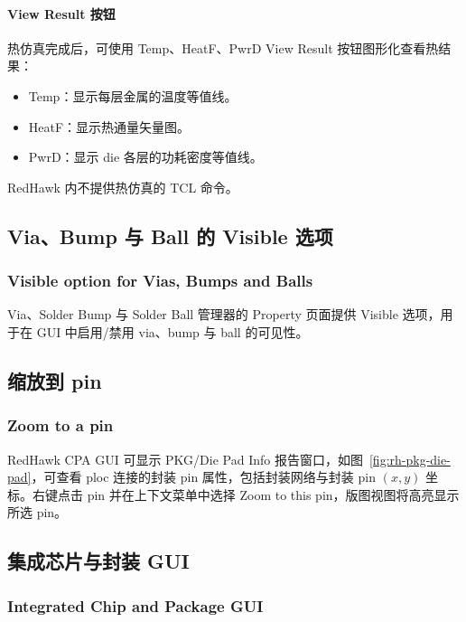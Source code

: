 \paragraph{View Result 按钮}
热仿真完成后，可使用 Temp、HeatF、PwrD View Result 按钮图形化查看热结果：
\begin{itemize}
  \item Temp：显示每层金属的温度等值线。
  \item HeatF：显示热通量矢量图。
  \item PwrD：显示 die 各层的功耗密度等值线。
\end{itemize}

RedHawk 内不提供热仿真的 TCL 命令。

\subsection{Via、Bump 与 Ball 的 Visible 选项}
\subsubsection*{Visible option for Vias, Bumps and Balls}

Via、Solder Bump 与 Solder Ball 管理器的 Property 页面提供 Visible 选项，用于在 GUI 中启用/禁用 via、bump 与 ball 的可见性。

\subsection{缩放到 pin}
\subsubsection*{Zoom to a pin}

RedHawk CPA GUI 可显示 PKG/Die Pad Info 报告窗口，如图~\ref{fig:rh-pkg-die-pad}，可查看 ploc 连接的封装 pin 属性，包括封装网络与封装 pin $(x, y)$ 坐标。右键点击 pin 并在上下文菜单中选择 Zoom to this pin，版图视图将高亮显示所选 pin。

\label{fig:rh-pkg-die-pad}

\subsection{集成芯片与封装 GUI}
\subsubsection*{Integrated Chip and Package GUI}

